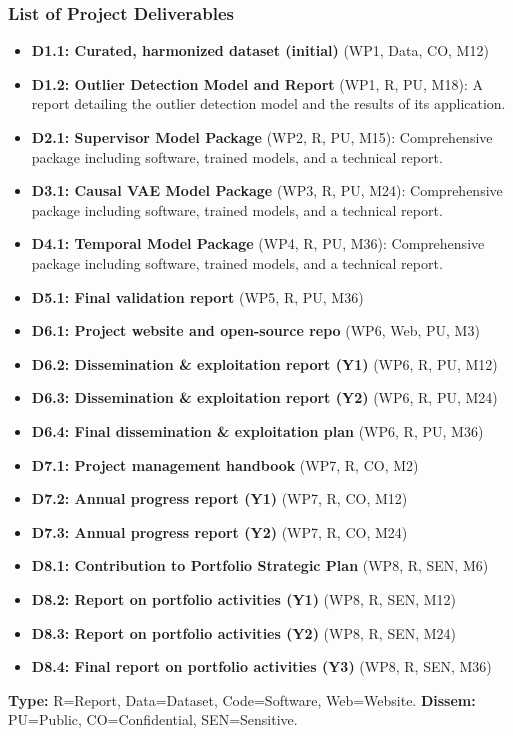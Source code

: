 \documentclass[11pt, a4paper]{article}
\begin{document}
\subsubsection*{List of Project Deliverables}
\begin{itemize}
    \item \textbf{D1.1: Curated, harmonized dataset (initial)} (WP1, Data, CO, M12)
    \item \textbf{D1.2: Outlier Detection Model and Report} (WP1, R, PU, M18): A report detailing the outlier detection model and the results of its application.
    \item \textbf{D2.1: Supervisor Model Package} (WP2, R, PU, M15): Comprehensive package including software, trained models, and a technical report.
    \item \textbf{D3.1: Causal VAE Model Package} (WP3, R, PU, M24): Comprehensive package including software, trained models, and a technical report.
    \item \textbf{D4.1: Temporal Model Package} (WP4, R, PU, M36): Comprehensive package including software, trained models, and a technical report.
    \item \textbf{D5.1: Final validation report} (WP5, R, PU, M36)
    \item \textbf{D6.1: Project website and open-source repo} (WP6, Web, PU, M3)
    \item \textbf{D6.2: Dissemination \& exploitation report (Y1)} (WP6, R, PU, M12)
    \item \textbf{D6.3: Dissemination \& exploitation report (Y2)} (WP6, R, PU, M24)
    \item \textbf{D6.4: Final dissemination \& exploitation plan} (WP6, R, PU, M36)
    \item \textbf{D7.1: Project management handbook} (WP7, R, CO, M2)
    \item \textbf{D7.2: Annual progress report (Y1)} (WP7, R, CO, M12)
    \item \textbf{D7.3: Annual progress report (Y2)} (WP7, R, CO, M24)
    \item \textbf{D8.1: Contribution to Portfolio Strategic Plan} (WP8, R, SEN, M6)
    \item \textbf{D8.2: Report on portfolio activities (Y1)} (WP8, R, SEN, M12)
    \item \textbf{D8.3: Report on portfolio activities (Y2)} (WP8, R, SEN, M24)
    \item \textbf{D8.4: Final report on portfolio activities (Y3)} (WP8, R, SEN, M36)
\end{itemize}
\footnotesize \textbf{Type:} R=Report, Data=Dataset, Code=Software, Web=Website. \textbf{Dissem:} PU=Public, CO=Confidential, SEN=Sensitive.
\end{document}
